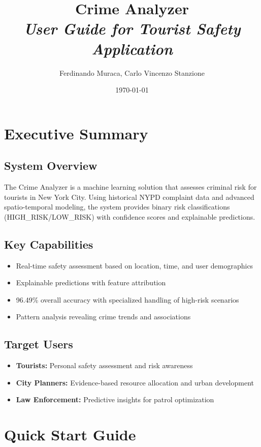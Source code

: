 \documentclass[11pt]{article}
\title{\Huge\textbf{Crime Analyzer}\\
       \Large\textit{User Guide for Tourist Safety Application}}
\author{Ferdinando Muraca, Carlo Vincenzo Stanzione}
\date{\today}
\begin{document}
\maketitle
\tableofcontents
\newpage

\section{Executive Summary}

\subsection{System Overview}
The Crime Analyzer is a machine learning solution that assesses criminal risk for tourists in New York City. Using historical NYPD complaint data and advanced spatio-temporal modeling, the system provides binary risk classifications (HIGH\_RISK/LOW\_RISK) with confidence scores and explainable predictions.

\subsection{Key Capabilities}
\begin{itemize}[leftmargin=*]
\item Real-time safety assessment based on location, time, and user demographics
\item Explainable predictions with feature attribution
\item 96.49\% overall accuracy with specialized handling of high-risk scenarios
\item Pattern analysis revealing crime trends and associations
\end{itemize}

\subsection{Target Users}
\begin{itemize}[leftmargin=*]
\item \textbf{Tourists:} Personal safety assessment and risk awareness
\item \textbf{City Planners:} Evidence-based resource allocation and urban development
\item \textbf{Law Enforcement:} Predictive insights for patrol optimization
\end{itemize}

\section{Quick Start Guide}
\end{document}
